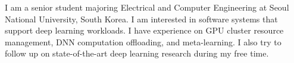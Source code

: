 

\begin{cvparagraph}

I am a senior student majoring Electrical and Computer Engineering at Seoul National University, South Korea. 
I am interested in software systems that support deep learning workloads. 
I have experience on GPU cluster resource management, DNN computation offloading, and meta-learning.
I also try to follow up on state-of-the-art deep learning research during my free time. 
\end{cvparagraph}
